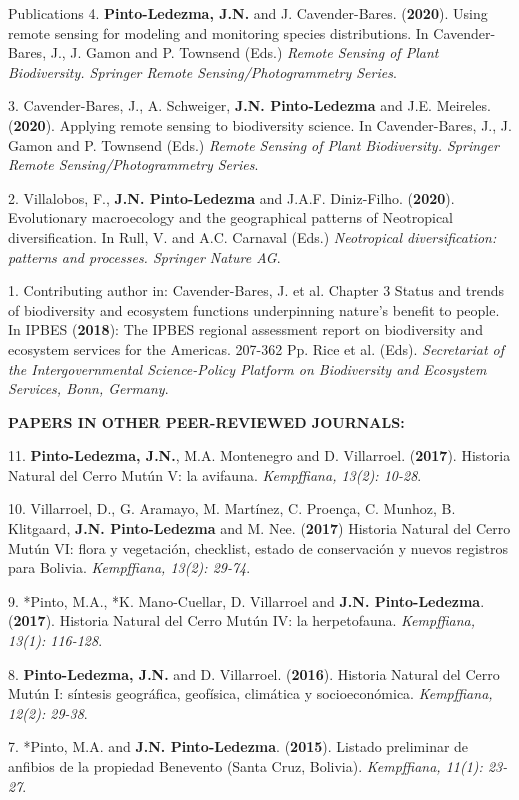 \documentclass{resume} %
\begin{document}
\begin{rSection}{Publications}
{4.} {\bf{Pinto-Ledezma, J.N.}} {and J. Cavender-Bares. ({{\bf 2020}}). Using remote sensing for modeling and monitoring species distributions. In Cavender-Bares, J., J. Gamon and P. Townsend (Eds.)} {\em Remote Sensing of Plant Biodiversity. Springer Remote Sensing/Photogrammetry Series}.

{3.} {Cavender-Bares, J., A. Schweiger,} {\bf{J.N. Pinto-Ledezma}} {and J.E. Meireles. ({{\bf 2020}}). Applying remote sensing to biodiversity science. In Cavender-Bares, J., J. Gamon and P. Townsend (Eds.)} {\em Remote Sensing of Plant Biodiversity. Springer Remote Sensing/Photogrammetry Series}. 

{2.} {Villalobos, F.,} {\bf{J.N. Pinto-Ledezma}} {and J.A.F. Diniz-Filho. ({{\bf 2020}}). Evolutionary macroecology and the geographical patterns of Neotropical diversification. In Rull, V. and A.C. Carnaval (Eds.)} {\em Neotropical diversification: patterns and processes. Springer Nature AG}. 

{1.} {Contributing author in: Cavender-Bares, J. et al. Chapter 3 Status and trends of biodiversity and ecosystem functions underpinning nature’s benefit to people. In IPBES ({{\bf 2018}}): {The IPBES regional assessment report on biodiversity and ecosystem services for the Americas}. 207-362 Pp. Rice et al. (Eds).} {\em Secretariat of the Intergovernmental Science-Policy Platform on Biodiversity and Ecosystem Services, Bonn, Germany}. 

{\bf PAPERS IN OTHER PEER-REVIEWED JOURNALS:} 

{11.} {\bf{Pinto-Ledezma, J.N.}}, {M.A. Montenegro and D. Villarroel. ({{\bf 2017}}). Historia Natural del Cerro Mutún V: la avifauna.} {\em Kempffiana, 13(2): 10-28}.

{10.} {Villarroel, D., G. Aramayo, M. Martínez, C. Proença, C. Munhoz, B. Klitgaard,} {\bf{J.N. Pinto-Ledezma}} {and M. Nee. ({{\bf 2017}}) Historia Natural del Cerro Mutún VI: flora y vegetación, checklist, estado de conservación y nuevos registros para Bolivia.} {\em Kempffiana, 13(2): 29-74}.

{9.} {*Pinto, M.A., *K. Mano-Cuellar, D. Villarroel and} {\bf{J.N. Pinto-Ledezma}}. {({{\bf 2017}}). Historia Natural del Cerro Mutún IV: la herpetofauna.} {\em Kempffiana, 13(1): 116-128}.

{8.} {\bf{Pinto-Ledezma, J.N.}} {and D. Villarroel. ({{\bf 2016}}). Historia Natural del Cerro Mutún I: síntesis geográfica, geofísica, climática y socioeconómica.} {\em Kempffiana, 12(2): 29-38}.

{7.} {*Pinto, M.A. and} {\bf{J.N. Pinto-Ledezma}}. {({{\bf 2015}}). Listado preliminar de anfibios de la propiedad Benevento (Santa Cruz, Bolivia).} {\em Kempffiana, 11(1): 23-27}.


\end{rSection}
\end{document}
